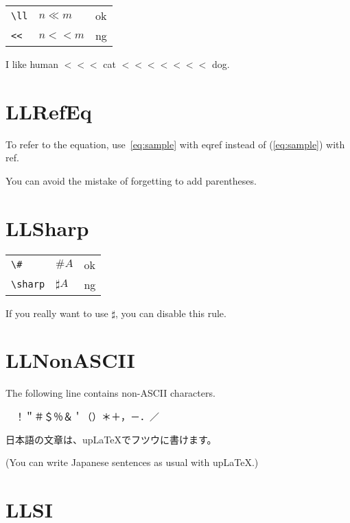 \documentclass[a4paper]{article}
\newcommand{\tA}[1]{\textcolor{cA}{#1}}
\newcommand{\tD}[1]{\textcolor{cD}{#1}}
\begin{document}
\begin{table}[H]
	\centering
	\begin{tabular}{lll}
		\verb|\ll| & $n\ll m$ & \tA{ok} \\
		\verb|<<|  & $n << m$ & \tD{ng} \\
	\end{tabular}
\end{table}

I like human $<<<$ cat $<<<<<<<$ dog.

\section{LLRefEq}

To refer to the equation, use~\eqref{eq:sample} with eqref instead of (\ref{eq:sample}) with ref.

You can avoid the mistake of forgetting to add parentheses.

\section{LLSharp}

\begin{table}[H]
	\centering
	\begin{tabular}{lll}
		\verb|\#|     & $\#A$      & \tA{ok} \\
		\verb|\sharp| & $\sharp A$ & \tD{ng}
	\end{tabular}
\end{table}

If you really want to use $\sharp$, you can disable this rule.

\section{LLNonASCII}

The following line contains non-ASCII characters.

\begin{CJK}{UTF8}{ipxm}{　}！＂＃＄％＆＇（）＊＋，－．／\end{CJK}

\vspace{\baselineskip}

\begin{CJK}{UTF8}{ipxm}日本語の文章は、upLaTeXでフツウに書けます。\end{CJK}

(You can write Japanese sentences as usual with upLaTeX.)

\section{LLSI}
\end{document}
